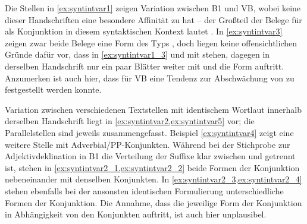Die Stellen in \cref{ex:syntintvar1} zeigen Variation zwischen B1
und VB, wobei keine dieser Handschriften eine besondere Affinität zu
 hat -- der Großteil der Belege für  als
Konjunktion in diesem syntaktischen Kontext lautet . In
\cref{ex:syntintvar3} zeigen zwar beide Belege eine Form des Typs
, doch liegen keine offensichtlichen Gründe dafür vor, dass in
\cref{ex:syntintvar1_3}   und  
mit  stehen, dagegen in der\-selben Handschrift nur ein paar Blätter
weiter mit   und   die Form
 auftritt. Anzumerken ist auch hier, dass für VB eine
Tendenz zur Abschwächung von  zu  festgestellt werden
konnte.

Variation zwischen verschiedenen Textstellen mit identischem Wortlaut innerhalb
der\-selben Handschrift liegt in \cref{ex:syntintvar2,ex:syntintvar5} vor; die
Parallelstellen sind jeweils zusammengefasst. Beispiel \cref{ex:syntintvar4}
zeigt eine weitere Stelle mit Adverbial/PP-Konjunkten. Während bei der
Stichprobe zur Adjektivdeklination in B1 die Verteilung der Suffixe
klar zwischen  und  getrennt ist, stehen in
\cref{ex:syntintvar2_1,ex:syntintvar2_2} beide Formen der Konjunktion
nebeneinander mit denselben Konjunkten. In
\cref{ex:syntintvar2_3,ex:syntintvar2_4} stehen ebenfalls bei der ansonsten
identischen Formulierung unterschiedliche Formen der Konjunktion. Die Annahme,
dass die jeweilige Form der Konjunktion in Abhängigkeit von den Konjunkten
auftritt, ist auch hier unplausibel.

